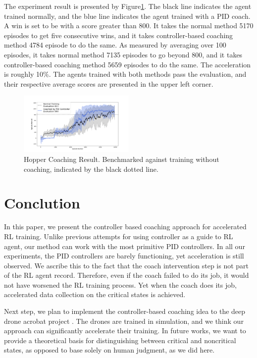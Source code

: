 \documentclass[journal]{IEEEtran}
\begin{document}
The experiment result is presented by Figure\ref{fig:walker_result}. The black line indicates the agent trained normally, and the blue line indicates the agent trained with a PID coach. A win is set to be with a score greater than 800. It takes the normal method 5170 episodes to get five consecutive wins, and it takes controller-based coaching method 4784 episode to do the same. As measured by averaging over 100 episodes, it takes normal method 7135 episodes to go beyond 800, and it takes controller-based coaching method 5659 episodes to do the same. The acceleration is roughly 10\%. The agents trained with both methods pass the evaluation, and their respective average scores are presented in the upper left corner.



\begin{figure}
     \centering
      \includegraphics[width=0.5\textwidth]{walker.png}
      \caption{Hopper Coaching Result. Benchmarked against training without coaching, indicated by the black dotted line.}
      \label{fig:walker_result}
\end{figure}





\section{Conclution}

In this paper, we present the controller based coaching approach for accelerated RL training. Unlike previous attempts for using controller as a guide to RL agent, our method can work with the most primitive PID controllers. In all our experiments, the PID controllers are barely functioning, yet acceleration is still observed. We ascribe this to the fact that the coach intervention step is not part of the RL agent record. Therefore, even if the coach failed to do its job, it would not have worsened the RL training process. Yet when the coach does its job, accelerated data collection on the critical states is achieved. 

Next step, we plan to implement the controller-based coaching idea to the deep drone acrobat project \cite{Kaufmann2020DeepDA}. The drones are trained in simulation, and we think our approach can significantly accelerate their training. In future works, we want to provide a theoretical basis for distinguishing between critical and noncritical states, as opposed to base solely on human judgment, as we did here. 
\end{document}
